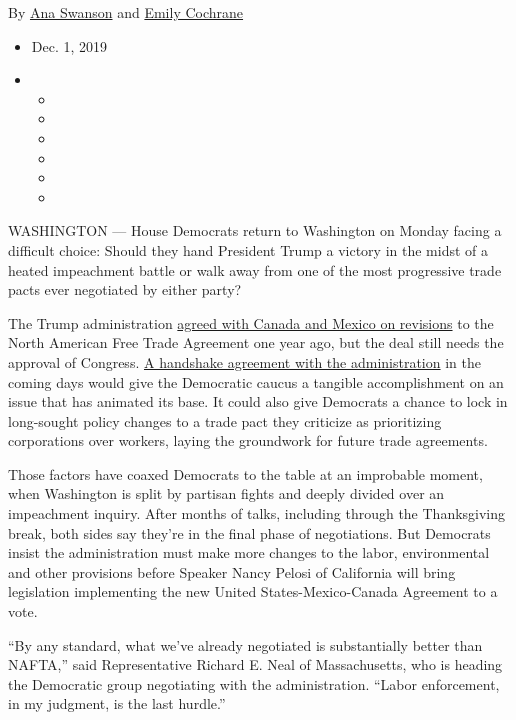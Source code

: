 By \href{https://www.nytimes.com/by/ana-swanson}{Ana Swanson} and
\href{https://www.nytimes.com/by/emily-cochrane}{Emily Cochrane}

\begin{itemize}
\item
  Dec. 1, 2019
\item
  \begin{itemize}
  \item
  \item
  \item
  \item
  \item
  \item
  \end{itemize}
\end{itemize}

WASHINGTON --- House Democrats return to Washington on Monday facing a
difficult choice: Should they hand President Trump a victory in the
midst of a heated impeachment battle or walk away from one of the most
progressive trade pacts ever negotiated by either party?

The Trump administration
\href{https://www.nytimes.com/2018/11/30/world/americas/trump-trudeau-canada-mexico.html}{agreed
with Canada and Mexico on revisions} to the North American Free Trade
Agreement one year ago, but the deal still needs the approval of
Congress.
\href{https://www.nytimes.com/2019/12/10/us/politics/trump-aides-and-democrats-strike-deal-on-north-american-trade-pact.html}{A
handshake agreement with the administration} in the coming days would
give the Democratic caucus a tangible accomplishment on an issue that
has animated its base. It could also give Democrats a chance to lock in
long-sought policy changes to a trade pact they criticize as
prioritizing corporations over workers, laying the groundwork for future
trade agreements.

Those factors have coaxed Democrats to the table at an improbable
moment, when Washington is split by partisan fights and deeply divided
over an impeachment inquiry. After months of talks, including through
the Thanksgiving break, both sides say they're in the final phase of
negotiations. But Democrats insist the administration must make more
changes to the labor, environmental and other provisions before Speaker
Nancy Pelosi of California will bring legislation implementing the new
United States-Mexico-Canada Agreement to a vote.

``By any standard, what we've already negotiated is substantially better
than NAFTA,'' said Representative Richard E. Neal of Massachusetts, who
is heading the Democratic group negotiating with the administration.
``Labor enforcement, in my judgment, is the last hurdle.''

